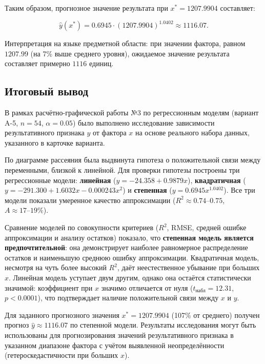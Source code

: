 Таким образом, прогнозное значение результата при \(x^* = 1207.9904\) составляет:

\[
\hat{y}(x^*) = 0.6945 \cdot (1207.9904)^{1.0402} \approx 1116.07.
\]

Интерпретация на языке предметной области: при значении фактора, равном \(1207.99\) (на 7\% выше среднего уровня), ожидаемое значение результата составляет примерно \(1116\) единиц.

\subsection{Итоговый вывод}

В рамках расчётно-графической работы №3 по регрессионным моделям (вариант A-5, \(n = 54\), \(\alpha = 0.05\)) было выполнено исследование зависимости результативного признака \(y\) от фактора \(x\) на основе реального набора данных, указанного в карточке варианта.

По диаграмме рассеяния была выдвинута гипотеза о положительной связи между переменными, близкой к линейной. Для проверки гипотезы построены три регрессионные модели: \textbf{линейная} (\(y = -24.358 + 0.9879x\)), \textbf{квадратичная} (\(y = -291.300 + 1.6032x - 0.000243x^2\)) и \textbf{степенная} (\(y = 0.6945x^{1.0402}\)). Все три модели показали умеренное качество аппроксимации (\(R^2 \approx 0.74\text{--}0.75\), \(A \approx 17\text{--}19\%\)).

Сравнение моделей по совокупности критериев (\(R^2\), RMSE, средней ошибке аппроксимации и анализу остатков) показало, что \textbf{степенная модель является предпочтительной}: она демонстрирует наиболее равномерное распределение остатков и наименьшую среднюю ошибку аппроксимации. Квадратичная модель, несмотря на чуть более высокий \(R^2\), даёт неестественное убывание при больших \(x\). Линейная модель уступает двум другим, однако она остаётся статистически значимой: коэффициент при \(x\) значимо отличается от нуля (\(t_{\text{набл}} = 12.31\), \(p < 0.0001\)), что подтверждает наличие положительной связи между \(x\) и \(y\).

Для заданного прогнозного значения \(x^* = 1207.9904\) (107\% от среднего) получен прогноз \(\hat{y} \approx 1116.07\) по степенной модели. Результаты исследования могут быть использованы для прогнозирования значений результативного признака в указанном диапазоне фактора с учётом выявленной неопределённости (гетероскедастичности при больших \(x\)).

